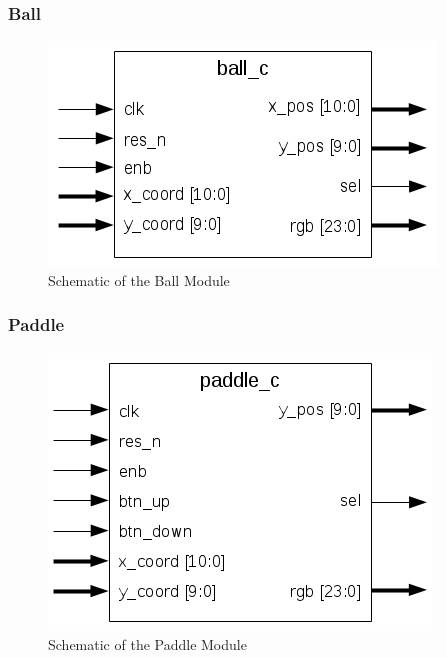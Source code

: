        \subsubsection{Ball}
	        \begin{figure}[h]
		        \centering
		        \includegraphics[scale=0.7]{images/ball_schematic.png}
		        \caption{Schematic of the Ball Module}
		        \label{ball_sch}
	        \end{figure}
        \subsubsection{Paddle}
	        \begin{figure}[h]
		        \centering
		        \includegraphics[scale=0.7]{images/paddle_schematic.png}
		        \caption{Schematic of the Paddle Module}
		        \label{paddle_sch}
	        \end{figure}

